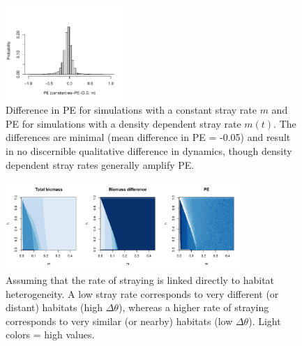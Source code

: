\documentclass[twocolumn,preprintnumbers,amsmath,amssymb,superscriptaddress]{revtex4}
\begin{document}
\begin{figure}
\centering
\includegraphics[width=0.4\textwidth]{figs/fig_diffddm.pdf}
\caption{
Difference in PE for simulations with a constant stray rate $m$ and PE for simulations with a density dependent stray rate $m(t)$. The differences are minimal (mean difference in PE = -0.05) and result in no discernible qualitative difference in dynamics, though density dependent stray rates generally amplify PE.
} \label{fig:diffddm}
\end{figure}

\begin{figure}
  \centering
  \includegraphics[width=0.8\textwidth]{figs/fig_MDPE_hm_mtheta.pdf}
  \caption{
  Assuming that the rate of straying is linked directly to habitat heterogeneity. A low stray rate corresponds to very different (or distant) habitats (high $\Delta\theta$), whereas a higher rate of straying corresponds to very similar (or nearby) habitats (low $\Delta\theta$). Light colors = high values.
  } \label{fig:mtheta}
\end{figure}

 
 
\end{document}
